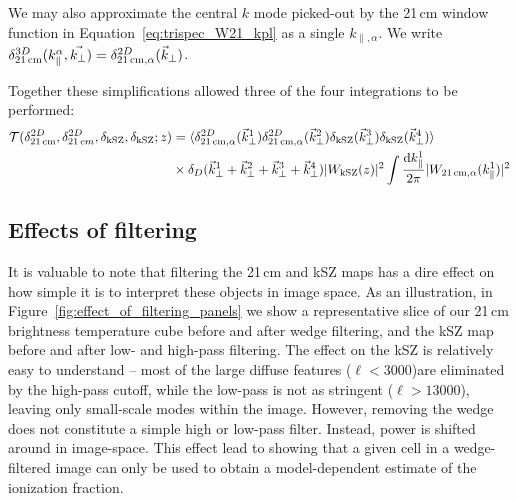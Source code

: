 We may also approximate the central $k$ mode picked-out by the 21\,cm window function in Equation~\ref{eq:trispec_W21_kpl} as a single $k_{\parallel,\alpha}$. We write $\delta^{3D}_{\rm 21\,cm}(k^{\alpha}_{\parallel},\vec{k_{\perp}}) = \delta^{2D}_{\rm 21\,cm,\alpha}(\vec{k}_{\perp})$.

Together these simplifications allowed three of the four integrations to be performed:
\begin{equation}
\begin{split}
\mathcal{T}(\delta^{2D}_{\rm 21\,cm}, \delta^{2D}_{21\,cm}, \delta_{\rm kSZ}, \delta_{\rm kSZ}; z) &= 
\langle \delta^{2D}_{\rm 21\,cm,\alpha}(\vec{k}^1_{\perp})  \delta^{2D}_{\rm 21\,cm,\alpha}(\vec{k}^2_{\perp})  \delta_{\rm kSZ}(\vec{k}^3_{\perp})\delta_{\rm kSZ}(\vec{k}^4_{\perp}) \rangle \\ 
& \times \delta_D(\vec{k}^1_{\perp} + \vec{k}^2_{\perp} + \vec{k}^3_{\perp} + \vec{k}^4_{\perp}) | W_{\rm kSZ}(z) |^2\int \frac{{\rm d}k^1_{\parallel}}{2\pi} | W_{\rm 21\,cm,\alpha} (k^1_{\parallel}) |^2
\end{split}
\label{eq:squeezed_trispec}
\end{equation}

\subsection{Effects of filtering}

It is valuable to note that filtering the 21\,cm and kSZ maps has a dire effect on how simple it is to interpret these objects in image space. As an illustration, in Figure~\ref{fig:effect_of_filtering_panels} we show a representative slice of our 21\,cm brightness temperature cube before and after wedge filtering, and the kSZ map before and after low- and high-pass filtering. The effect on the kSZ is relatively easy to understand -- most of the large diffuse features ($\ell < 3000$)are eliminated by the high-pass cutoff, while the low-pass is not as stringent ($\ell > 13000$), leaving only small-scale modes within the image. However, removing the wedge does not constitute a simple high or low-pass filter. Instead, power is shifted around in image-space. This effect lead to \cite{Beardsley.15} showing that a given cell in a wedge-filtered image can only be used to obtain a model-dependent estimate of the ionization fraction.

